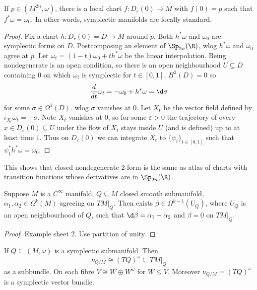 \documentclass[a4paper]{article}
\begin{document}
\begin{theorem}[Darboux]
  If \(p \in (M^{2n}, \omega)\), there is a local chart \(f: D_\varepsilon(0) \to M\) with \(f(0) = p\) such that \(f^*\omega = \omega_0\). In other words, symplectic manifolds are locally standard.
\end{theorem}

\begin{proof}
  Fix a chart \(h: D_r(0) = D \to M\) around \(p\). Both \(h^*\omega\) and \(\omega_0\) are symplectic forms on \(D\). Postcomposing an element of \(\Sp_{2n}(\R)\), wlog \(h^*\omega\) and \(\omega_0\) agree at \(p\). Let \(\omega_t = (1 - t)\omega_0 + t h^*\omega\) be the linear interpolation. Being nondegenerate is an open condition, so there is an open neighbourhood \(U \subseteq D\) containing \(0\) on which \(\omega_t\) is symplectic for \(t \in [0, 1]\). \(H^2(D) = 0\) so
  \[
    \frac{d}{dt} \omega_t = -\omega_0 + h^*\omega = \d \sigma
  \]
  for some \(\sigma \in \Omega^1(D)\). wlog \(\sigma\) vanishes at \(0\). Let \(X_t\) be the vector field defined by \(\iota_{X_t} \omega_t = -\sigma\). Note \(X_t\) vanishes at \(0\), so for some \(\varepsilon > 0\) the trajectory of every \(x \in D_\varepsilon(0) \subseteq U\) under the flow of \(X_t\) stays inside \(U\) (and is defined) up to at least time \(1\). Thus on \(D_\varepsilon(0)\) we can integrate \(X_t\) to \(\{\psi_t\}_{t \in [0, 1]}\) such that \(\psi_1^*h^* \omega = \omega_0\).
\end{proof}

\begin{remark}
  This shows that closed nondegenerate \(2\)-form is the same as atlas of charts with transition functions whose derivatives are in \(\Sp_{2n}(\R)\).
\end{remark}

\begin{theorem}
  Suppose \(M\) is a \(C^\infty\) manifold, \(Q \subseteq M\) closed smooth submanifold, \(\alpha_1, \alpha_2 \in \Omega^k(M)\) agreeing on \(TM|_Q\). Then exists \(\beta \in \Omega^{k - 1}(U_Q)\), where \(U_Q\) is an open neighbourhood of \(Q\), such that \(\d \beta = \alpha_1 - \alpha_2\) and \(\beta = 0\) on \(TM|_Q\).
\end{theorem}

\begin{proof}
  Example sheet 2. Use partition of unity.
\end{proof}

\begin{note}
  If \(Q \subseteq (M, \omega)\) is a symplectic submanifold. Then
  \[
    \nu_{Q/M} \cong (TQ)^\omega \subseteq TM|_Q
  \]
  as a subbundle. On each fibre \(V \cong W \oplus W^\omega\) for \(W \leq V\). Moreover \(\nu_{Q/M} = (TQ)^\omega\) is a symplectic vector bundle.
\end{note}
\end{document}
